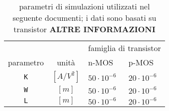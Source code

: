 	\begin{table}[bht]
		
		\centering
		\begin{tabular}{ c c | p{2cm}  p{2cm}}
			& & \multicolumn{2}{c}{famiglia di transistor }  \\
			parametro & unità & n-MOS & p-MOS \\ \hline 
			\texttt{K} & $[A/V^2]$ & $50\cdot 10^{-6}$ & $20\cdot 10^{-6}$ \\
			\texttt{W} & $[m]$ & $50\cdot 10^{-6}$ & $20\cdot 10^{-6}$ \\
			\texttt{L} & $[m]$ & $50\cdot 10^{-6}$ & $20\cdot 10^{-6}$ \\
		\end{tabular}
		\caption{parametri di simulazioni utilizzati nel seguente documenti; i dati sono basati su transistor \textbf{ALTRE INFORMAZIONI}}
		
	\end{table}